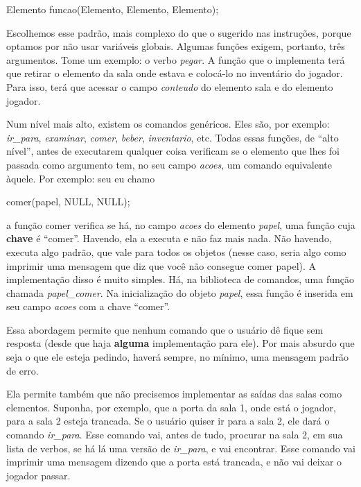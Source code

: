 \documentclass{article}
\begin{document}
\begin{spverbatim}
  Elemento funcao(Elemento, Elemento, Elemento);
\end{spverbatim} \medskip

Escolhemos esse padrão, mais complexo do que o sugerido nas instruções, porque
optamos por não usar variáveis globais. Algumas funções exigem, portanto, três
argumentos. Tome um exemplo: o verbo\emph{ pegar}. A função que o implementa
terá que retirar o elemento da sala onde estava e colocá-lo no inventário do
jogador. Para isso, terá que acessar o campo\emph{ conteudo} do elemento sala e
do elemento jogador.

Num nível mais alto, existem os comandos genéricos. Eles são, por exemplo:
\emph{ir\_para}, \emph{examinar}, \emph{comer}, \emph{beber}, \emph{inventario},
etc. Todas essas funções, de ``alto nível'', antes de executarem qualquer coisa
verificam se o elemento que lhes foi passada como argumento tem, no seu campo
\emph{acoes}, um comando equivalente àquele. Por exemplo: seu eu chamo

\begin{spverbatim}
  comer(papel, NULL, NULL);
\end{spverbatim} \medskip

a função comer verifica se há, no campo\emph{ acoes} do elemento\emph{ papel},
uma função cuja \textbf{chave} é ``comer''. Havendo, ela a executa e não faz
mais nada. Não havendo, executa algo padrão, que vale para todos os objetos
(nesse caso, seria algo como imprimir uma mensagem que diz que você não consegue
comer papel). A implementação disso é muito simples. Há, na biblioteca de
comandos, uma função chamada \emph{papel\_comer}. Na inicialização do
objeto\emph{ papel}, essa função é inserida em seu campo\emph{ acoes} com a
chave ``comer''.

Essa abordagem permite que nenhum comando que o usuário dê fique sem resposta
(desde que haja \textbf{alguma} implementação para ele). Por mais absurdo que seja o que
ele esteja pedindo, haverá sempre, no mínimo, uma mensagem padrão de erro.

Ela permite também que não precisemos implementar as saídas das salas como
elementos. Suponha, por exemplo, que a porta da sala 1, onde está o jogador,
para a sala 2 esteja trancada. Se o usuário quiser ir para a sala 2, ele dará o
comando\emph{ ir\_para}. Esse comando vai, antes de tudo, procurar na sala 2, em
sua lista de verbos, se há lá uma versão de\emph{ ir\_para}, e vai encontrar.
Esse comando vai imprimir uma mensagem dizendo que a porta está trancada, e não
vai deixar o jogador passar.
\end{document}
